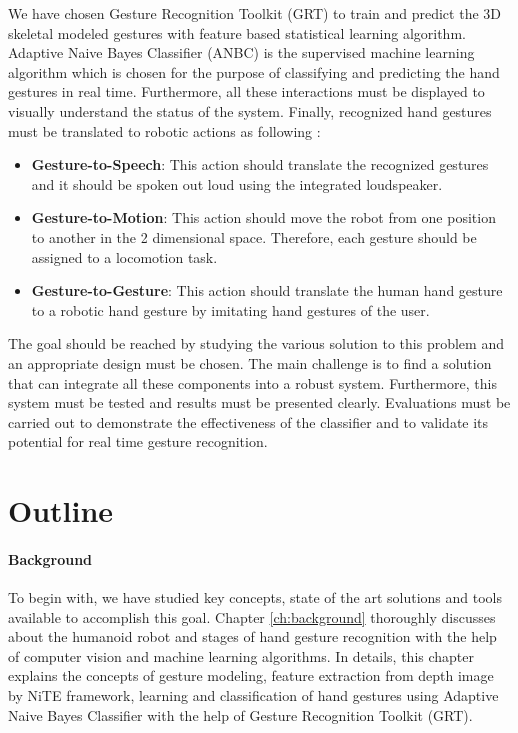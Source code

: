 We have chosen Gesture Recognition Toolkit (GRT) to train and predict the 3D skeletal modeled gestures with feature based statistical learning algorithm. Adaptive Naive Bayes Classifier (ANBC) is the supervised machine learning algorithm which is chosen for the purpose of classifying and predicting the hand gestures in real time. Furthermore, all these interactions must be displayed to visually understand the status of the system. Finally, recognized hand gestures must be translated to robotic actions as following :
\begin{itemize}
	\item \textbf{Gesture-to-Speech}: This action should translate the recognized gestures and it should be spoken out loud using the integrated loudspeaker.
	
	\item \textbf{Gesture-to-Motion}: This action should move the robot from one position to another in the 2 dimensional space. Therefore, each gesture should be assigned to a locomotion task.
	
	\item \textbf{Gesture-to-Gesture}: This action should translate the human hand gesture to a robotic hand gesture by imitating hand gestures of the user. 
\end{itemize}

The goal should be reached by studying the various solution to this problem and an appropriate design must be chosen. The main challenge is to find a solution that can integrate all these components into a robust system. Furthermore, this system must be tested and results must be presented clearly. Evaluations must be carried out to demonstrate the effectiveness of the classifier and to validate its potential for real time gesture recognition.

\section{Outline}

\paragraph*{Background} To begin with, we have studied key concepts, state of the art solutions and tools available to accomplish this goal. Chapter \ref{ch:background} thoroughly discusses about the humanoid robot and stages of hand gesture recognition with the help of computer vision and machine learning algorithms. In details, this chapter explains the concepts of gesture modeling, feature extraction from depth image by NiTE framework, learning and classification of hand gestures using Adaptive Naive Bayes Classifier with the help of Gesture Recognition Toolkit (GRT).

